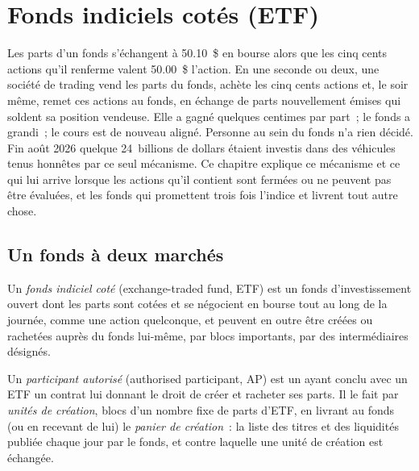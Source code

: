 \chapter{Fonds indiciels cotés (ETF)}\label{ch:m1:exchange-traded-funds}

Les parts d'un fonds s'échangent à 50.10~\$ en bourse alors que les cinq cents
actions qu'il renferme valent 50.00~\$ l'action. En une seconde ou deux, une
société de trading vend les parts du fonds, achète les cinq cents actions et, le soir même, remet ces
actions au fonds, en échange de parts nouvellement émises qui soldent
sa position vendeuse. Elle a gagné quelques centimes par part~; le fonds a grandi~; le cours
est de nouveau aligné. Personne au sein du fonds n'a rien décidé. Fin août 2026
quelque 24~billions de dollars étaient investis dans des véhicules tenus honnêtes par
ce seul mécanisme. Ce chapitre explique ce mécanisme et ce qui lui arrive
lorsque les actions qu'il contient sont fermées ou ne peuvent pas être évaluées, et les fonds
qui promettent trois fois l'indice et livrent tout autre chose.

\section{Un fonds à deux marchés}

\begin{definition}\label{def:m1:exchange-traded-funds:etf}
Un \emph{fonds indiciel coté} (exchange-traded fund, ETF) est un
fonds d'investissement ouvert dont les parts sont cotées et se négocient en bourse
tout au long de la journée, comme une action quelconque, et peuvent en outre être
créées ou rachetées auprès du fonds lui-même, par blocs importants, par des intermédiaires désignés.
\end{definition}

\begin{definition}\label{def:m1:exchange-traded-funds:ap}
Un \emph{participant autorisé} (authorised participant, AP) est un
 ayant conclu avec un ETF un contrat lui donnant le droit de créer et
racheter ses parts. Il le fait par \emph{unités de création},
blocs d'un nombre fixe de parts d'ETF, en livrant au fonds (ou
en recevant de lui) le \emph{panier de création}~: la
liste des titres et des liquidités publiée chaque jour par le fonds, et
contre laquelle une unité de création est échangée.
\end{definition}

